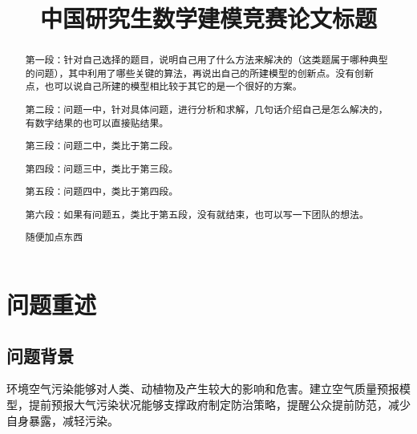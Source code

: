 \documentclass[bwprint]{gmcmthesis}
\title{中国研究生数学建模竞赛论文标题}
\numberwithin{figure}{section}
\begin{document}
 \maketitle
 \begin{abstract}
第一段：针对自己选择的题目，说明自己用了什么方法来解决的（这类题属于哪种典型的问题），其中利用了哪些关键的算法，再说出自己的所建模型的创新点。没有创新点，也可以说自己所建的模型相比较于其它的是一个很好的方案。

第二段：问题一中，针对具体问题，进行分析和求解，几句话介绍自己是怎么解决的，有数字结果的也可以直接贴结果。

第三段：问题二中，类比于第二段。

第四段：问题三中，类比于第三段。

第五段：问题四中，类比于第四段。

第六段：如果有问题五，类比于第五段，没有就结束，也可以写一下团队的想法。

随便加点东西






\end{abstract}


\tableofcontents

\section{问题重述}
\subsection{问题背景}
环境空气污染能够对人类、动植物及产生较大的影响和危害。建立空气质量预报模型，提前预报大气污染状况能够支撑政府制定防治策略，提醒公众提前防范，减少自身暴露，减轻污染。
\end{document}
